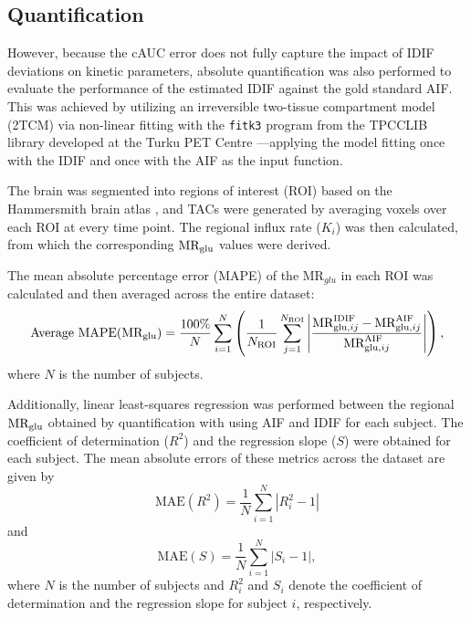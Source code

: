 \subsection{Quantification}
However, because the cAUC error does not fully capture the impact of IDIF deviations on kinetic parameters, absolute quantification was also performed to evaluate the performance of the estimated IDIF against the gold standard AIF.
This was achieved by utilizing an irreversible two-tissue compartment model (2TCM) via non-linear fitting with the \texttt{fitk3} program from the TPCCLIB library developed at the Turku PET Centre \cite{oikonen2018tpcclib}—applying the model fitting once with the IDIF and once with the AIF as the input function.

The brain was segmented into regions of interest (ROI) based on the Hammersmith brain atlas \cite{hammers2003three}, and TACs were generated by averaging voxels over each ROI at every time point.
The regional influx rate (\(K_i\)) was then calculated, from which the corresponding \(\text{MR}_{\text{glu}}\) values were derived.

The mean absolute percentage error (MAPE) of the \(\textrm{MR}_{glu}\) in each ROI was calculated and then averaged across the entire dataset:
\begin{equation}
	\text{Average MAPE}(\text{MR}_{\text{glu}})= \frac{100\%}{N} \sum_{i=1}^{N} \left( \frac{1}{N_{\text{ROI}}} \sum_{j=1}^{N_{\text{ROI}}} \left| \frac{\textrm{MR}_{\textrm{glu},ij}^{\textrm{IDIF}} - \textrm{MR}_{\textrm{glu},ij}^{\textrm{AIF}}}{\textrm{MR}_{\textrm{glu},ij}^{\textrm{AIF}}} \right| \right),
\end{equation}
where $N$ is the number of subjects.

Additionally, linear least-squares regression was performed between the regional \(\text{MR}_{\text{glu}}\) obtained by quantification with using AIF and IDIF for each subject. The coefficient of determination (\(R^2\)) and the regression slope (\(S\)) were obtained for each subject. The mean absolute errors of these metrics across the dataset are given by
\begin{equation}
	\text{MAE}(R^2) = \frac{1}{N} \sum_{i=1}^{N} \left| R^2_i - 1 \right|
\end{equation}
and
\begin{equation}
	\text{MAE}(S) = \frac{1}{N} \sum_{i=1}^{N} \left| S_i - 1 \right|,
\end{equation}
where $N$ is the number of subjects and \(R^2_i\) and \(S_i\) denote the coefficient of determination and the regression slope for subject \(i\), respectively.

